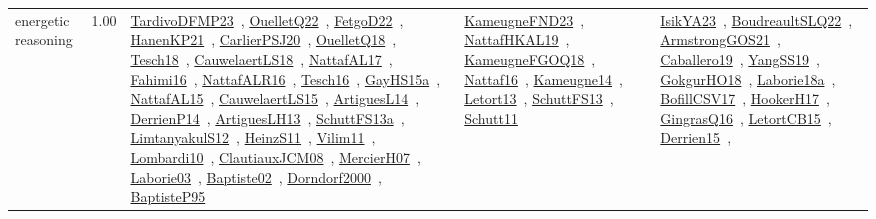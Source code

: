 {\begin{longtable}{p{3cm}r>{\raggedright\arraybackslash}p{6cm}>{\raggedright\arraybackslash}p{6cm}>{\raggedright\arraybackslash}p{8cm}}
\index{energetic reasoning}\index{Algorithms!energetic reasoning}energetic reasoning &  1.00 & \href{../works/TardivoDFMP23.pdf}{TardivoDFMP23}~\cite{TardivoDFMP23}, \href{../works/OuelletQ22.pdf}{OuelletQ22}~\cite{OuelletQ22}, \href{../works/FetgoD22.pdf}{FetgoD22}~\cite{FetgoD22}, \href{../works/HanenKP21.pdf}{HanenKP21}~\cite{HanenKP21}, \href{../works/CarlierPSJ20.pdf}{CarlierPSJ20}~\cite{CarlierPSJ20}, \href{../works/OuelletQ18.pdf}{OuelletQ18}~\cite{OuelletQ18}, \href{../works/Tesch18.pdf}{Tesch18}~\cite{Tesch18}, \href{../works/CauwelaertLS18.pdf}{CauwelaertLS18}~\cite{CauwelaertLS18}, \href{../works/NattafAL17.pdf}{NattafAL17}~\cite{NattafAL17}, \href{../works/Fahimi16.pdf}{Fahimi16}~\cite{Fahimi16}, \href{../works/NattafALR16.pdf}{NattafALR16}~\cite{NattafALR16}, \href{../works/Tesch16.pdf}{Tesch16}~\cite{Tesch16}, \href{../works/GayHS15a.pdf}{GayHS15a}~\cite{GayHS15a}, \href{../works/NattafAL15.pdf}{NattafAL15}~\cite{NattafAL15}, \href{../works/CauwelaertLS15.pdf}{CauwelaertLS15}~\cite{CauwelaertLS15}, \href{../works/ArtiguesL14.pdf}{ArtiguesL14}~\cite{ArtiguesL14}, \href{../works/DerrienP14.pdf}{DerrienP14}~\cite{DerrienP14}, \href{../works/ArtiguesLH13.pdf}{ArtiguesLH13}~\cite{ArtiguesLH13}, \href{../works/SchuttFS13a.pdf}{SchuttFS13a}~\cite{SchuttFS13a}, \href{../works/LimtanyakulS12.pdf}{LimtanyakulS12}~\cite{LimtanyakulS12}, \href{../works/HeinzS11.pdf}{HeinzS11}~\cite{HeinzS11}, \href{../works/Vilim11.pdf}{Vilim11}~\cite{Vilim11}, \href{../works/Lombardi10.pdf}{Lombardi10}~\cite{Lombardi10}, \href{../works/ClautiauxJCM08.pdf}{ClautiauxJCM08}~\cite{ClautiauxJCM08}, \href{../works/MercierH07.pdf}{MercierH07}~\cite{MercierH07}, \href{../works/Laborie03.pdf}{Laborie03}~\cite{Laborie03}, \href{../works/Baptiste02.pdf}{Baptiste02}~\cite{Baptiste02}, \href{../works/Dorndorf2000.pdf}{Dorndorf2000}~\cite{Dorndorf2000}, \href{../works/BaptisteP95.pdf}{BaptisteP95}~\cite{BaptisteP95} & \href{../works/KameugneFND23.pdf}{KameugneFND23}~\cite{KameugneFND23}, \href{../works/NattafHKAL19.pdf}{NattafHKAL19}~\cite{NattafHKAL19}, \href{../works/KameugneFGOQ18.pdf}{KameugneFGOQ18}~\cite{KameugneFGOQ18}, \href{../works/Nattaf16.pdf}{Nattaf16}~\cite{Nattaf16}, \href{../works/Kameugne14.pdf}{Kameugne14}~\cite{Kameugne14}, \href{../works/Letort13.pdf}{Letort13}~\cite{Letort13}, \href{../works/SchuttFS13.pdf}{SchuttFS13}~\cite{SchuttFS13}, \href{../works/Schutt11.pdf}{Schutt11}~\cite{Schutt11} & \href{../works/IsikYA23.pdf}{IsikYA23}~\cite{IsikYA23}, \href{../works/BoudreaultSLQ22.pdf}{BoudreaultSLQ22}~\cite{BoudreaultSLQ22}, \href{../works/ArmstrongGOS21.pdf}{ArmstrongGOS21}~\cite{ArmstrongGOS21}, \href{../works/Caballero19.pdf}{Caballero19}~\cite{Caballero19}, \href{../works/YangSS19.pdf}{YangSS19}~\cite{YangSS19}, \href{../works/GokgurHO18.pdf}{GokgurHO18}~\cite{GokgurHO18}, \href{../works/Laborie18a.pdf}{Laborie18a}~\cite{Laborie18a}, \href{../works/BofillCSV17.pdf}{BofillCSV17}~\cite{BofillCSV17}, \href{../works/HookerH17.pdf}{HookerH17}~\cite{HookerH17}, \href{../works/GingrasQ16.pdf}{GingrasQ16}~\cite{GingrasQ16}, \href{../works/LetortCB15.pdf}{LetortCB15}~\cite{LetortCB15}, \href{../works/Derrien15.pdf}{Derrien15}~\cite{Derrien15}, 
\end{longtable}}

